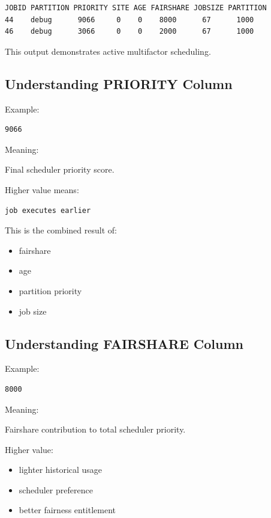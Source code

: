 \documentclass[11pt]{article}
\begin{document}
\begin{verbatim}
JOBID PARTITION PRIORITY SITE AGE FAIRSHARE JOBSIZE PARTITION
44    debug      9066     0    0    8000      67      1000
46    debug      3066     0    0    2000      67      1000
\end{verbatim}

This output demonstrates active multifactor scheduling.
\subsection{Understanding PRIORITY Column}
\label{sec:orgc7f3316}

Example:

\begin{verbatim}
9066
\end{verbatim}

Meaning:

Final scheduler priority score.

Higher value means:

\begin{verbatim}
job executes earlier
\end{verbatim}

This is the combined result of:

\begin{itemize}
\item fairshare
\item age
\item partition priority
\item job size
\end{itemize}
\subsection{Understanding FAIRSHARE Column}
\label{sec:orgaeff282}

Example:

\begin{verbatim}
8000
\end{verbatim}

Meaning:

Fairshare contribution to total scheduler priority.

Higher value:

\begin{itemize}
\item lighter historical usage
\item scheduler preference
\item better fairness entitlement
\end{itemize}
\end{document}
